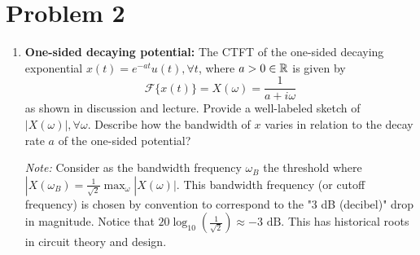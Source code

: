 \documentclass[10pt]{article}
\begin{document}
	\section*{Problem 2}
	\begin{enumerate}[label=\alph*)]
		\item \textbf{One-sided decaying potential:} The CTFT of the one-sided decaying exponential \( x(t) = 
			e^{-at} u(t), \forall t\), where \( a >0 \in \mathbb R \) is given by 
			\[
				\mathcal F\{x(t)\} = X(\omega) = \frac{1}{a + i \omega}
			\] 
			as shown in discussion and lecture. Provide a well-labeled sketch of \( |X(\omega)|, \forall \omega \). 
			Describe how the bandwidth of \( x \) varies in relation to the decay rate \( a \) of the one-sided
			potential?

			\textit{Note:} Consider as the bandwidth frequency \( \omega_B \) the threshold where 
			\( |X(\omega_B) = \frac{1}{\sqrt{2} }\max_\omega |X(\omega)| \). This bandwidth frequency (or cutoff 
			frequency) is chosen by convention to correspond to the "3 dB (decibel)" drop in magnitude. Notice that 
			\( 20 \log_{10}(\frac{1}{\sqrt{2} }) \approx -3 \text{ dB} \). This has historical roots in circuit 
			theory and design. 


\end{enumerate}
\end{document}
